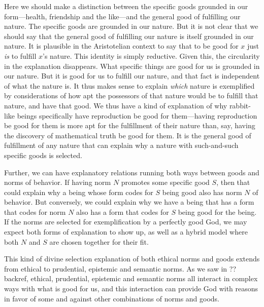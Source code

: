 Here we should make a distinction between the specific goods grounded in our form---health, friendship and the like---and
the general good of fulfilling our nature. The specific goods are grounded in our nature. But it is not clear that we should say that 
the general good of fulfilling our nature is itself grounded in our nature. It is plausible in the Aristotelian context to say that 
to be good for $x$ just \textit{is} to fulfill $x$'s nature. This identity is simply reductive. Given this, the circularity
in the explanation disappears. What specific things are good for us is grounded in our nature. But it is good for us to fulfill
our nature, and that fact is independent of what the nature is. It thus makes sense to explain \textit{which} nature is 
exemplified by considerations of how apt the possessors of that nature would be to fulfill that nature, and have that good.
We thus have a kind of explanation of why rabbit-like beings specifically have reproduction be good for them---having reproduction
be good for them is more apt for the fulfillment of their nature than, say, having the discovery of mathematical truth be good
for them. It is the general good of fulfillment of any nature that can explain why a nature with such-and-such specific goods is
selected.

Further, we can have explanatory relations running both ways between goods and norms of behavior. If having norm $N$ promotes
some specific good $S$, then that could explain why a being whose form codes for $S$ being good also has norm $N$ of behavior.
But conversely, we could explain why we have a being that has a form that codes for norm $N$ also has a form
that codes for $S$ being good for the being. 
If the norms are selected for exemplification by a perfectly good God, we may expect both forms of explanation to show up,
as well as a hybrid model where both $N$ and $S$ are chosen together for their fit.

This kind of divine selection explanation of both ethical norms and goods extends from ethical to prudential, epistemic and 
semantic norms. As we saw in ??backref, ethical, prudential, epistemic and semantic norms all interact in complex ways with 
what is good for us, and this interaction can provide God with reasons in favor of some and against other combinations of
norms and goods.


